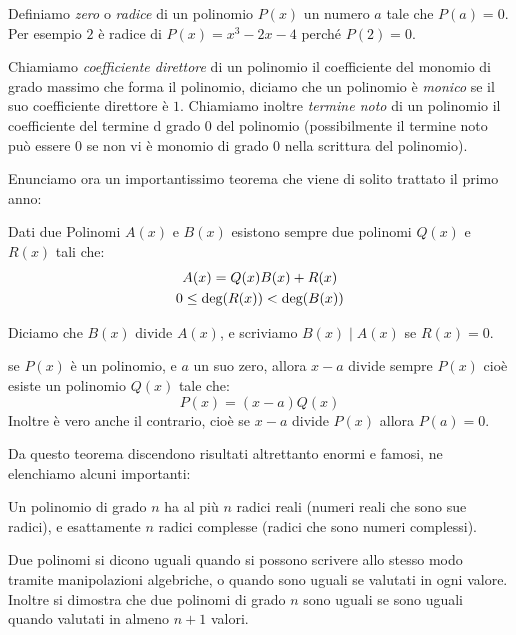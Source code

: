 \documentclass[11pt]{scrartcl}
\begin{document}
	\begin{definition}
		Definiamo \textit{zero} o \textit{radice} di un polinomio $P(x)$ un numero $a$ tale che $P(a)=0$. Per esempio $2$ è radice di $P(x)=x^3-2x-4$ perché $P(2)=0$.
	\end{definition}
	\begin{definition}
		Chiamiamo \textit{coefficiente direttore} di un polinomio il coefficiente del monomio di grado massimo che forma il polinomio, diciamo che un polinomio è \textit{monico} se il suo coefficiente direttore è $1$. Chiamiamo inoltre \textit{termine noto} di un polinomio il coefficiente del termine d grado $0$ del polinomio (possibilmente il termine noto può essere $0$ se non vi è monomio di grado $0$ nella scrittura del polinomio).
	\end{definition}
	Enunciamo ora un importantissimo teorema che viene di solito trattato il primo anno:
	\begin{theorem}
		Dati due Polinomi $A(x)$ e $B(x)$ esistono sempre due polinomi $Q(x)$ e $R(x)$ tali che:
		\begin{gather}
			\notag A(x)=Q(x)B(x)+R(x) \\
			\notag 0\le \text{deg}(R(x))<\text{deg}(B(x))
		\end{gather}
	\end{theorem}
	\begin{definition}
		Diciamo che $B(x)$ divide $A(x)$, e scriviamo $B(x) \mid A(x)$ se $R(x)=0$.
	\end{definition}
	\begin{theorem}[Ruffini]
		se $P(x)$ è un polinomio, e $a$ un suo zero, allora $x-a$ divide sempre $P(x)$ cioè esiste un polinomio $Q(x)$ tale che:
		$$P(x)=(x-a)Q(x)$$
		Inoltre è vero anche il contrario, cioè se $x-a$ divide $P(x)$ allora $P(a)=0$.
	\end{theorem}
	Da questo teorema discendono risultati altrettanto enormi e famosi, ne elenchiamo alcuni importanti:
	\begin{theorem}
		Un polinomio di grado $n$ ha al più $n$ radici reali (numeri reali che sono sue radici), e esattamente $n$ radici complesse (radici che sono numeri complessi).
	\end{theorem}
	\begin{theorem}
		Due polinomi si dicono uguali quando si possono scrivere allo stesso modo tramite manipolazioni algebriche, o quando sono uguali se valutati in ogni valore. Inoltre si dimostra che due polinomi di grado $n$ sono uguali se sono uguali quando valutati in almeno $n+1$ valori.
	\end{theorem}
\end{document}
